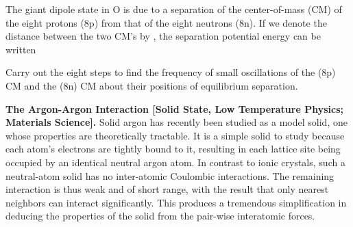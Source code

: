 {\begin{one-digit-list}
The giant dipole state in O is due to a separation of the center-of-mass
(CM) of the eight protons (8p) from that of the eight neutrons (8n).
If we denote the distance between the two CM's by , the separation
potential energy can be written
%
%
%
%
%
%
%
%

Carry out the eight steps to find the frequency of small oscillations of the
(8p) CM and the (8n) CM about their positions of equilibrium separation.
%
\item [4.] {\bf The Argon-Argon  Interaction
[Solid State, Low Temperature Physics; Materials Science].}
Solid argon has recently been studied as a model solid, one whose properties
are theoretically tractable.
It is a simple solid to study because each atom's electrons are tightly
bound to it, resulting in each lattice site being occupied by an identical
neutral argon atom.
In contrast to ionic crystals, such a neutral-atom solid has no inter-atomic
Coulombic interactions.
The remaining interaction is thus weak and of short range, with the result
that only nearest neighbors can interact significantly.
This produces a tremendous simplification in deducing the properties of the
solid from the pair-wise interatomic forces.


\end{one-digit-list}}
